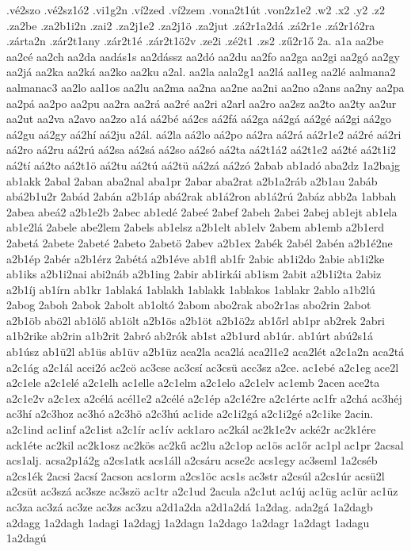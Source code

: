 {.vé2szo
.vé2sz1ó2
.vi1g2n
.ví2zed
.ví2zem
.vona2t1út
.von2z1e2
.w2
.x2
.y2
.z2
.za2be
.za2b1i2n
.zai2
.za2j1e2
.za2j1ö
.za2jut
.zá2r1a2dá
.zá2r1e
.zá2r1ó2ra
.zárta2n
.zár2t1any
.zár2t1é
.zár2t1ö2v
.ze2i
.zé2t1
.zs2
.zű2r1ő
2a.
a1a
aa2be
aa2cé
aa2ch
aa2da
aadás1s
aa2dássz
aa2dó
aa2du
aa2fo
aa2ga
aa2gi
aa2gó
aa2gy
aa2já
aa2ka
aa2ká
aa2ko
aa2ku
a2al.
aa2la
aala2g1
aa2lá
aal1eg
aa2lé
aalmana2
aalmanac3
aa2lo
aal1os
aa2lu
aa2ma
aa2na
aa2ne
aa2ni
aa2no
a2ans
aa2ny
aa2pa
aa2pá
aa2po
aa2pu
aa2ra
aa2rá
aa2ré
aa2ri
a2arl
aa2ro
aa2sz
aa2to
aa2ty
aa2ur
aa2ut
aa2va
a2avo
aa2zo
a1á
aá2bé
aá2cs
aá2fá
aá2ga
aá2gá
aá2gé
aá2gi
aá2go
aá2gu
aá2gy
aá2hí
aá2ju
a2ál.
aá2la
aá2lo
aá2po
aá2ra
aá2rá
aá2r1e2
aá2ré
aá2ri
aá2ro
aá2ru
aá2rú
aá2sa
aá2sá
aá2so
aá2só
aá2ta
aá2t1á2
aá2t1e2
aá2té
aá2t1i2
aá2tí
aá2to
aá2t1ö
aá2tu
aá2tú
aá2tü
aá2zá
aá2zó
2abab
ab1adó
aba2dz
1a2bajg
ab1akk
2abal
2aban
aba2nal
aba1pr
2abar
aba2rat
a2b1a2ráb
a2b1au
2abáb
abá2b1u2r
2abád
2abán
a2b1áp
abá2rak
ab1á2ron
ab1á2rú
2abáz
abb2a
1abbah
2abea
abeá2
a2b1e2b
2abec
ab1edé
2abeé
2abef
2abeh
2abei
2abej
ab1ejt
ab1ela
ab1e2lá
2abele
abe2lem
2abels
ab1elsz
a2b1elt
ab1elv
2abem
ab1emb
a2b1erd
2abetá
2abete
2abeté
2abeto
2abetö
2abev
a2b1ex
2abék
2abél
2abén
a2b1é2ne
a2b1ép
2abér
a2b1érz
2abétá
a2b1éve
ab1fl
ab1fr
2abic
ab1i2do
2abie
ab1i2ke
ab1iks
a2b1i2nai
abi2náb
a2b1ing
2abir
ab1irkái
ab1ism
2abit
a2b1i2ta
2abiz
a2b1íj
ab1írn
ab1kr
1ablaká
1ablakh
1ablakk
1ablakos
1ablakr
2ablo
a1b2lú
2abog
2aboh
2abok
2abolt
ab1oltó
2abom
abo2rak
abo2r1as
abo2rin
2abot
a2b1öb
abö2l
ab1ölő
ab1ölt
a2b1ös
a2b1öt
a2b1ö2z
ab1őrl
ab1pr
ab2rek
2abri
a1b2rike
ab2rin
a1b2rit
2abró
ab2rók
ab1st
a2b1urd
ab1úr.
ab1úrt
abú2s1á
ab1úsz
ab1ü2l
ab1üs
ab1üv
a2b1üz
aca2la
aca2lá
aca2l1e2
aca2lét
a2c1a2n
aca2tá
a2c1ág
a2c1ál
acci2ó
ac2cö
ac3cse
ac3csí
ac3csü
acc3sz
a2ce.
ac1ebé
a2c1eg
ace2l
a2c1ele
a2c1elé
a2c1elh
ac1elle
a2c1elm
a2c1elo
a2c1elv
ac1emb
2acen
ace2ta
a2c1e2v
a2c1ex
a2célá
acél1e2
a2célé
a2c1ép
a2c1é2re
a2c1érte
ac1fr
a2chá
ac3héj
ac3hí
a2c3hoz
ac3hó
a2c3hö
a2c3hú
ac1ide
a2c1i2gá
a2c1i2gé
a2c1ike
2acin.
a2c1ind
ac1inf
a2c1ist
a2c1ír
ac1ív
ack1aro
ac2kál
ac2k1e2v
acké2r
ac2k1ére
ack1éte
ac2kil
ac2k1osz
ac2kös
ac2kű
ac2lu
a2c1op
ac1ös
ac1őr
ac1pl
ac1pr
2acsal
acs1alj.
acsa2p1á2g
a2cs1atk
acs1áll
a2csáru
acse2c
acs1egy
ac3seml
1a2cséb
a2cs1ék
2acsi
2acsí
2acson
acs1orm
a2cs1öc
acs1s
ac3str
a2csúl
a2cs1úr
acsü2l
a2csüt
ac3szá
ac3sze
ac3szö
ac1tr
a2c1ud
2acula
a2c1ut
ac1új
ac1üg
ac1ür
ac1üz
ac3za
ac3zá
ac3ze
ac3zs
ac3zu
a2d1a2da
a2d1a2dá
1a2dag.
ada2gá
1a2dagb
a2dagg
1a2dagh
1adagi
1a2dagj
1a2dagn
1a2dago
1a2dagr
1a2dagt
1adagu
1a2dagú
}
